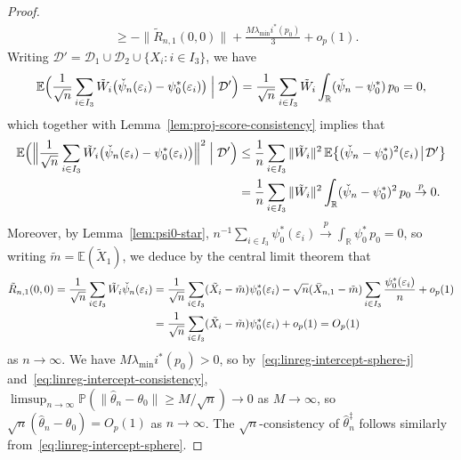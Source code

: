 \documentclass[a4paper]{article}
\newcommand{\R}{\mathbb{R}}
\newcommand{\E}{\mathbb{E}}
\renewcommand{\Pr}{\mathbb{P}}
\newcommand{\norm}[1]{\|{#1}\|}
\newcommand{\cvp}{\overset{p}{\to}}
\theoremstyle{definition}
\begin{document}
\begin{proof}
\begin{align}
&\geq -\norm{\tilde{R}_{n,1}(0,0)} + \frac{M\lambda_{\min}i^*(p_0)}{3} + o_p(1).
\end{align}
Writing $\mathcal{D}' = \mathcal{D}_1 \cup \mathcal{D}_2 \cup \{X_i : i \in I_3\}$, we have
\[
\E\Bigl(\frac{1}{\sqrt{n}}\sum_{i \in I_3} \tilde{W}_i\bigl(\check{\psi}_n(\varepsilon_i) - \psi_0^*(\varepsilon_i)\bigr) \Bigm| \mathcal{D}'\Bigr) = \frac{1}{\sqrt{n}}\sum_{i \in I_3} \tilde{W}_i \int_\R (\check{\psi}_n - \psi_0^*)\,p_0 = 0,
\]
which together with Lemma~\ref{lem:proj-score-consistency} implies that
\begin{align*}
\E\Bigl(\Bigl\|\frac{1}{\sqrt{n}}\sum_{i \in I_3} \tilde{W}_i\bigl(\check{\psi}_n(\varepsilon_i) - \psi_0^*(\varepsilon_i)\bigr)\Bigr\|^2 \Bigm| \mathcal{D}'\Bigr) &\leq \frac{1}{n}\sum_{i \in I_3}\norm{\tilde{W}_i}^2\,\E\bigl\{(\check{\psi}_n - \psi_0^*)^2(\varepsilon_i) \!\bigm|\! \mathcal{D}'\bigr\} \\
&= \frac{1}{n}\sum_{i \in I_3}\norm{\tilde{W}_i}^2 \int_\R (\check{\psi}_n - \psi_0^*)^2\,p_0 \cvp 0.
\end{align*}
Moreover, by Lemma~\ref{lem:psi0-star}, $n^{-1}\sum_{i \in I_3}\psi_0^*(\varepsilon_i) \cvp \int_\R \psi_0^*\,p_0 = 0$, so writing $\tilde{m} = \E(\tilde{X}_1)$, we deduce by the central limit theorem that
\begin{align}
\tilde{R}_{n,1}(0,0) = \frac{1}{\sqrt{n}}\sum_{i \in I_3} \tilde{W}_i\check{\psi}_n(\varepsilon_i) 
&= \frac{1}{\sqrt{n}}\sum_{i \in I_3} (\tilde{X}_i - \tilde{m})\psi_0^*(\varepsilon_i) - \sqrt{n}(\bar{X}_{n,1} - \tilde{m}) \sum_{i \in I_3} \frac{\psi_0^*(\varepsilon_i)}{n} + o_p(1) \notag \\
\label{eq:linreg-intercept-clt}
&= \frac{1}{\sqrt{n}}\sum_{i \in I_3} (\tilde{X}_i - \tilde{m})\psi_0^*(\varepsilon_i) + o_p(1) = O_p(1)
\end{align}
as $n \to \infty$. We have $M\lambda_{\min}i^*(p_0) > 0$, so by~\eqref{eq:linreg-intercept-sphere-j} and~\eqref{eq:linreg-intercept-consistency}, $\limsup_{n \to \infty}\Pr(\norm{\hat{\theta}_n - \theta_0} \geq M/\sqrt{n}) \to 0$ as $M \to \infty$, so $\sqrt{n}(\hat{\theta}_n - \theta_0) = O_p(1)$ as $n \to \infty$. The $\sqrt{n}$-consistency of $\hat{\theta}_n^\ddagger$ follows similarly from~\eqref{eq:linreg-intercept-sphere}.


\end{proof}
\end{document}
